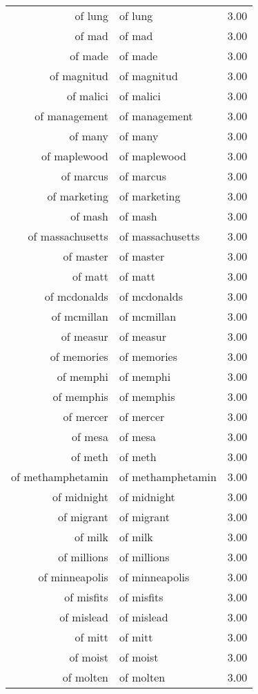 \begin{table}[ht]
\begin{tabular}{rlr}
  of lung & of lung & 3.00 \\ 
  of mad & of mad & 3.00 \\ 
  of made & of made & 3.00 \\ 
  of magnitud & of magnitud & 3.00 \\ 
  of malici & of malici & 3.00 \\ 
  of management & of management & 3.00 \\ 
  of many & of many & 3.00 \\ 
  of maplewood & of maplewood & 3.00 \\ 
  of marcus & of marcus & 3.00 \\ 
  of marketing & of marketing & 3.00 \\ 
  of mash & of mash & 3.00 \\ 
  of massachusetts & of massachusetts & 3.00 \\ 
  of master & of master & 3.00 \\ 
  of matt & of matt & 3.00 \\ 
  of mcdonalds & of mcdonalds & 3.00 \\ 
  of mcmillan & of mcmillan & 3.00 \\ 
  of measur & of measur & 3.00 \\ 
  of memories & of memories & 3.00 \\ 
  of memphi & of memphi & 3.00 \\ 
  of memphis & of memphis & 3.00 \\ 
  of mercer & of mercer & 3.00 \\ 
  of mesa & of mesa & 3.00 \\ 
  of meth & of meth & 3.00 \\ 
  of methamphetamin & of methamphetamin & 3.00 \\ 
  of midnight & of midnight & 3.00 \\ 
  of migrant & of migrant & 3.00 \\ 
  of milk & of milk & 3.00 \\ 
  of millions & of millions & 3.00 \\ 
  of minneapolis & of minneapolis & 3.00 \\ 
  of misfits & of misfits & 3.00 \\ 
  of mislead & of mislead & 3.00 \\ 
  of mitt & of mitt & 3.00 \\ 
  of moist & of moist & 3.00 \\ 
  of molten & of molten & 3.00 \\ 

\end{tabular}
\end{table}
